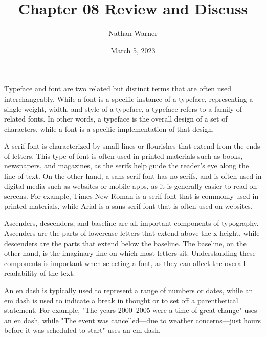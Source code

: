 \documentclass{report}
\title{\Huge{Chapter 08 Review and Discuss}}
\author{\huge{Nathan Warner}}
\date{\huge{March 5, 2023}}
\begin{document}
    \maketitle
    \noindent
    \bigbreak \noindent 
    \bigbreak \noindent 
    Typeface and font are two related but distinct terms that are often used interchangeably. While a font is a specific instance of a typeface, representing a single weight, width, and style of a typeface, a typeface refers to a family of related fonts. In other words, a typeface is the overall design of a set of characters, while a font is a specific implementation of that design.


    \bigbreak \noindent \bigbreak \noindent 
    \bigbreak \noindent 
    \bigbreak \noindent 
    A serif font is characterized by small lines or flourishes that extend from the ends of letters. This type of font is often used in printed materials such as books, newspapers, and magazines, as the serifs help guide the reader's eye along the line of text. On the other hand, a sans-serif font has no serifs, and is often used in digital media such as websites or mobile apps, as it is generally easier to read on screens. For example, Times New Roman is a serif font that is commonly used in printed materials, while Arial is a sans-serif font that is often used on websites.

    \bigbreak \noindent \bigbreak \noindent 
    \bigbreak \noindent 
    \bigbreak \noindent 
    Ascenders, descenders, and baseline are all important components of typography. Ascenders are the parts of lowercase letters that extend above the x-height, while descenders are the parts that extend below the baseline. The baseline, on the other hand, is the imaginary line on which most letters sit. Understanding these components is important when selecting a font, as they can affect the overall readability of the text.
    
    \bigbreak \noindent \bigbreak \noindent 
    \bigbreak \noindent 
    \bigbreak \noindent 
    An en dash is typically used to represent a range of numbers or dates, while an em dash is used to indicate a break in thought or to set off a parenthetical statement. For example, "The years 2000–2005 were a time of great change" uses an en dash, while "The event was cancelled—due to weather concerns—just hours before it was scheduled to start" uses an em dash.
    
\end{document}
